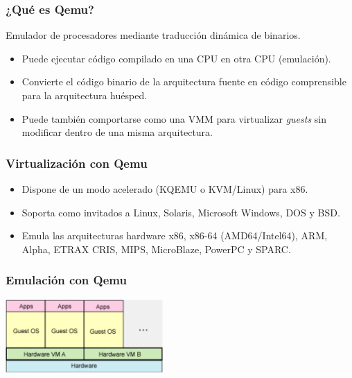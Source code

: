 \documentclass{beamer}
\begin{document}
\begin{frame}
\frametitle{¿Qué es Qemu?}

\begin{definition}
Emulador de procesadores mediante traducción dinámica de binarios.
\end{definition}

\begin{itemize}
\item Puede ejecutar código compilado en una CPU en otra CPU (\alert{emulación}). 
\item Convierte el código binario de la arquitectura fuente en código comprensible para la arquitectura huésped.
\item Puede también comportarse como una VMM para \alert{virtualizar} \textit{guests} sin modificar dentro de una misma arquitectura.
\end{itemize}

\end{frame}

\begin{frame}
\frametitle{Virtualización con Qemu}

\begin{itemize}
\item Dispone de un modo acelerado (KQEMU o KVM/Linux) para x86.
\item Soporta como invitados a  Linux, Solaris, Microsoft Windows, DOS y BSD.
\item Emula las arquitecturas hardware x86, x86-64 (AMD64/Intel64), ARM, Alpha, ETRAX CRIS, MIPS, MicroBlaze, PowerPC y SPARC. 
\end{itemize}

\end{frame}


\begin{frame}
\frametitle{Emulación con Qemu}

\begin{center}
\includegraphics[width=6cm,clip=false]{figs/emulation.png}
\end{center}

\end{frame}
\end{document}
